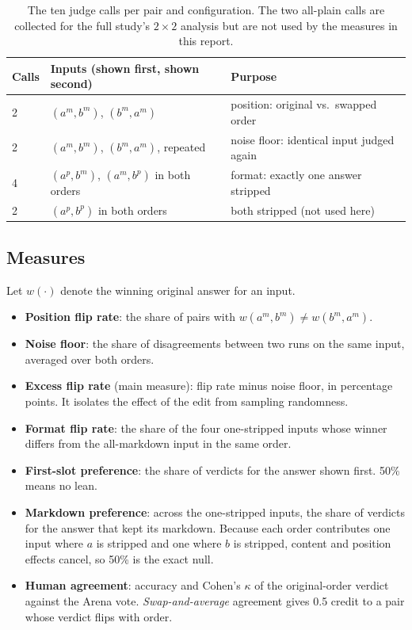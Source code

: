 \documentclass[10pt]{article}
\begin{document}
\begin{table}[H]
\centering\small
\caption{The ten judge calls per pair and configuration. The two all-plain calls are collected for the full
study's $2\times2$ analysis but are not used by the measures in this report.}
\label{tab:design}
\begin{tabular}{lll}
\toprule
Calls & Inputs (shown first, shown second) & Purpose \\
\midrule
2 & $(a^m, b^m)$, $(b^m, a^m)$ & position: original vs.\ swapped order \\
2 & $(a^m, b^m)$, $(b^m, a^m)$, repeated & noise floor: identical input judged again \\
4 & $(a^p,b^m)$, $(a^m,b^p)$ in both orders & format: exactly one answer stripped \\
2 & $(a^p,b^p)$ in both orders & both stripped (not used here) \\
\bottomrule
\end{tabular}
\end{table}

\subsection{Measures}
Let $w(\cdot)$ denote the winning original answer for an input.
\begin{itemize}
\item \textbf{Position flip rate}: the share of pairs with $w(a^m,b^m) \neq w(b^m,a^m)$.
\item \textbf{Noise floor}: the share of disagreements between two runs on the same input, averaged over both orders.
\item \textbf{Excess flip rate} (main measure): flip rate minus noise floor, in percentage points. It isolates the
effect of the edit from sampling randomness.
\item \textbf{Format flip rate}: the share of the four one-stripped inputs whose winner differs from the
all-markdown input in the same order.
\item \textbf{First-slot preference}: the share of verdicts for the answer shown first. 50\% means no lean.
\item \textbf{Markdown preference}: across the one-stripped inputs, the share of verdicts for the answer that
kept its markdown. Because each order contributes one input where $a$ is stripped and one where $b$ is stripped,
content and position effects cancel, so 50\% is the exact null.
\item \textbf{Human agreement}: accuracy and Cohen's $\kappa$ of the original-order verdict against the Arena
vote. \emph{Swap-and-average} agreement gives 0.5 credit to a pair whose verdict flips with order.
\end{itemize}
\end{document}
